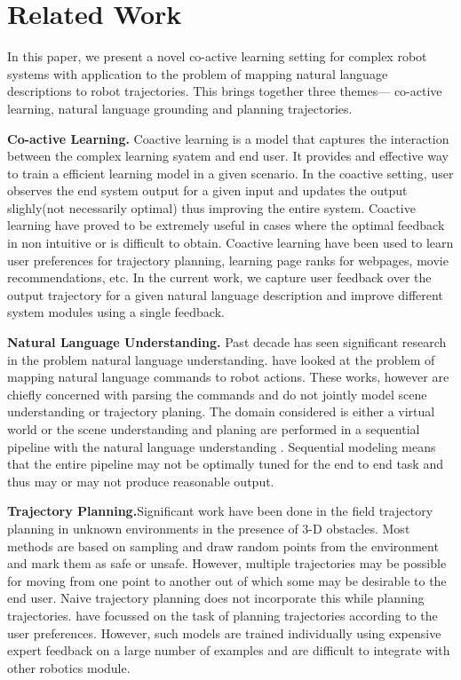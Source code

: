 \section{Related Work}
In this paper, we present a novel co-active learning setting for complex robot systems with application to the problem of mapping natural language descriptions to robot trajectories. This brings together three themes--- co-active learning, natural language grounding and planning trajectories.

\noindent\textbf{Co-active Learning.}
Coactive learning is a model that captures the interaction between the complex learning syatem and end user. It provides and effective way to train a efficient learning model in a given scenario. In the coactive setting, user observes the end system output for a given input and updates the output slighly(not necessarily optimal) thus improving the entire system. Coactive learning have proved to be extremely useful in cases where the optimal feedback in non intuitive or is difficult to obtain. Coactive learning have been used to learn user preferences for trajectory planning, learning page ranks for webpages, movie recommendations, etc. In the current work, we capture user feedback over the output trajectory for a given natural language description and improve different system modules using a single feedback. 

\noindent\textbf{Natural Language Understanding.} Past decade has seen significant research in the problem natural language understanding. \cite{tellex2011understanding,fasola2013using,misra2014tell,chen2010training,artzi2013weakly,matuszek2012grounded, Mei2015Navigational,branavan2012learning} have looked at the problem of mapping natural language commands to robot actions. These works, however are chiefly concerned with parsing the commands and do not jointly model scene understanding or trajectory planing. The domain considered is either a virtual world \cite{chen2010training,artzi2013weakly,matuszek2012grounded, Mei2015Navigational,branavan2012learning} or the scene understanding and planing are performed in a sequential pipeline with the natural language understanding \cite{tellex2011understanding,misra2014tell}. Sequential modeling means that the entire pipeline may not be optimally tuned for the end to end task and thus may or may not produce reasonable output. 

\noindent\textbf{Trajectory Planning.}Significant work have been done in the field trajectory planning in unknown environments in the presence of 3-D obstacles. Most methods are based on sampling and draw random points from the environment and mark them as safe or unsafe. However, multiple trajectories may be possible for moving from one point to another out of which some may be desirable to the end user. Naive trajectory planning does not incorporate this while planning trajectories. \cite{planit,nipscoactiveplanning} have focussed on the task of planning trajectories according to the user preferences. However, such models are trained individually using expensive expert feedback on a large number of examples and are difficult to integrate with other robotics module.

\vspace{3.6em}
\iffalse
The TellMeDave system translates natural language sentences to actions
sequences. PlanIt systems evaluates planning trajectories based on human
context. We have combined the systems resulting in an end-to-end system which
uses RoboBrain for features running on Weaver. 
\fi
